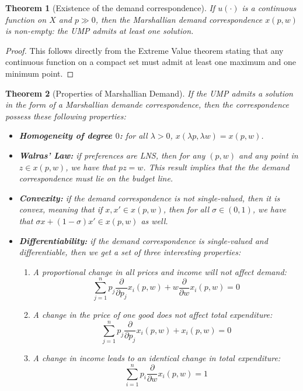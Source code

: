 \documentclass[12pt]{report}
\newtheorem{theorem}{Theorem}[chapter]
\begin{document}
\begin{theorem}[Existence of the demand correspondence]
If $u(\cdot)$ is a continuous function on $X$ and $p\gg 0$, then the Marshallian demand correspondence $x(p,w)$ is non-empty: the UMP admits at least one solution.
\end{theorem}

\begin{proof}
This follows directly from the Extreme Value theorem stating that any continuous function on a compact set must admit at least one maximum and one minimum point.
\end{proof}

\begin{theorem}[Properties of Marshallian Demand]
If the UMP admits a solution in the form of a Marshallian demande correspondence, then the correspondence possess these following properties:\begin{itemize}
\item \textbf{Homogeneity of degree $0$:} for all $\lambda >0$, $x(\lambda p, \lambda w) = x(p,w)$.
\item \textbf{Walras' Law:} if preferences are LNS, then for any $(p,w)$ and any point in $z\in x(p,w)$, we have that $pz = w$. This result implies that the the demand correspondence must lie on the budget line.
\item \textbf{Convexity:} if the demand correspondence is not single-valued, then it is convex, meaning that if $x, x'\in x(p,w)$, then for all $\sigma\in(0,1)$, we have that $\sigma x + (1-\sigma) x'\in x(p,w)$ as well.
\item \textbf{Differentiability:} if the demand correspondence is single-valued and differentiable, then we get a set of three interesting properties:\begin{enumerate}
\item A proportional change in all prices and income will not affect demand: $$\sum_{j=1}^{n} p_j\frac{\partial}{\partial p_j} x_i(p,w) + w\frac{\partial}{\partial w}x_i(p,w) = 0 $$
\item A change in the price of one good does not affect total expenditure: $$\sum_{j=1}^{n} p_j\frac{\partial}{\partial p_j} x_i(p,w) + x_i(p,w) = 0 $$
\item A change in income leads to an identical change in total expenditure: $$\sum_{i=1}^{n} p_i\frac{\partial}{\partial w} x_i(p,w) = 1 $$
\end{enumerate}
\end{itemize}
\end{theorem}
\end{document}
